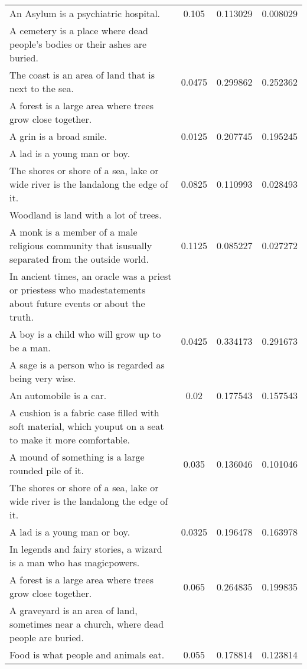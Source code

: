 \begin{center}
{\begin{longtable}{|p{9cm}|c|c|c|}
An Asylum is a psychiatric hospital. & 0.105 & 0.113029 & 0.008029 \\
A cemetery is a place where dead people's bodies or their ashes are buried. & & & \\
\hline
The coast is an area of land that is next to the sea. & 0.0475 & 0.299862 & 0.252362 \\
A forest is a large area where trees grow close together. & & & \\
\hline
A grin is a broad smile. & 0.0125 & 0.207745 & 0.195245 \\
A lad is a young man or boy. & & & \\
\hline
The shores or shore of a sea, lake or wide river is the landalong the edge of it. & 0.0825 & 0.110993 & 0.028493 \\
Woodland is land with a lot of trees. & & & \\
\hline
A monk is a member of a male religious community that isusually separated from the outside world. & 0.1125 & 0.085227 & 0.027272 \\
In ancient times, an oracle was a priest or priestess who madestatements about future events or about the truth. & & & \\
\hline
A boy is a child who will grow up to be a man. & 0.0425 & 0.334173 & 0.291673 \\
A sage is a person who is regarded as being very wise. & & & \\
\hline
An automobile is a car. & 0.02 & 0.177543 & 0.157543 \\
A cushion is a fabric case filled with soft material, which youput on a seat to make it more comfortable. & & & \\
\hline
A mound of something is a large rounded pile of it. & 0.035 & 0.136046 & 0.101046 \\
The shores or shore of a sea, lake or wide river is the landalong the edge of it. & & & \\
\hline
A lad is a young man or boy. & 0.0325 & 0.196478 & 0.163978 \\
In legends and fairy stories, a wizard is a man who has magicpowers. & & & \\
\hline
A forest is a large area where trees grow close together. & 0.065 & 0.264835 & 0.199835 \\
A graveyard is an area of land, sometimes near a church, where dead people are buried. & & & \\
\hline
Food is what people and animals eat. & 0.055 & 0.178814 & 0.123814 \\

\end{longtable}}
\end{center}

